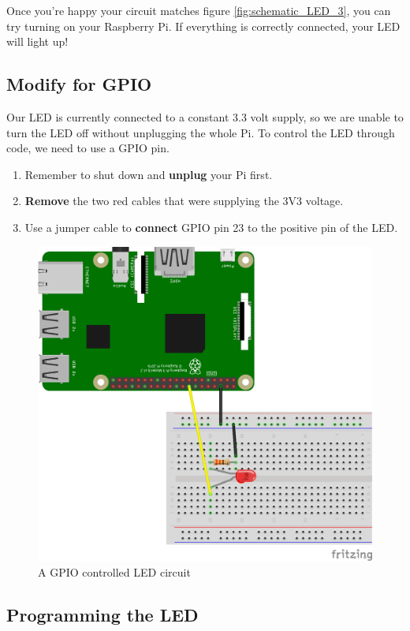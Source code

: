 		Once you're happy your circuit matches figure \ref{fig:schematic_LED_3}, you can try turning on your Raspberry Pi. If everything is correctly connected, your LED will light up!
		
	\subsection{Modify for GPIO}
	
			Our LED is currently connected to a constant 3.3 volt supply, so we are unable to turn the LED off without unplugging the whole Pi. To control the LED through code, we need to use a GPIO pin.
	
			\begin{enumerate}[nosep]
				\item Remember to shut down and \textbf{unplug} your Pi first.
				\item \textbf{Remove} the two red cables that were supplying the 3V3 voltage.
				\item Use a jumper cable to \textbf{connect} GPIO pin 23 to the positive pin of the LED.
			\end{enumerate}	
		
			\begin{figure}[h]
				\centering
				\includegraphics[width=0.7\linewidth]{McrRaspJam/011_Motors/1_LED/schematic_LED_4}
				\caption{A GPIO controlled LED circuit}
				\label{fig:schematic_LED_4}
			\end{figure}
		
	\subsection{Programming the LED}
		
